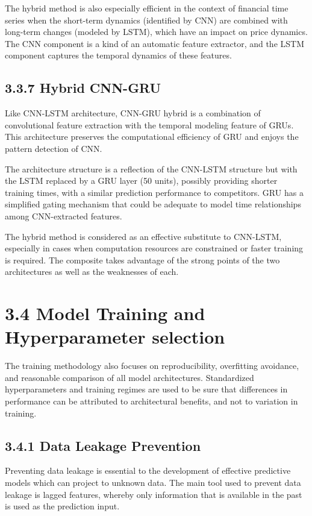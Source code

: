 \documentclass[12pt,a4paper]{report}
\begin{document}
The hybrid method is also especially efficient in the context of financial time series when the short-term dynamics (identified by CNN) are combined with long-term changes (modeled by LSTM), which have an impact on price dynamics. The CNN component is a kind of an automatic feature extractor, and the LSTM component captures the temporal dynamics of these features.

\subsection{3.3.7 Hybrid CNN-GRU}
Like CNN-LSTM architecture, CNN-GRU hybrid is a combination of convolutional feature extraction with the temporal modeling feature of GRUs. This architecture preserves the computational efficiency of GRU and enjoys the pattern detection of CNN.

The architecture structure is a reflection of the CNN-LSTM structure but with the LSTM replaced by a GRU layer (50 units), possibly providing shorter training times, with a similar prediction performance to competitors. GRU has a simplified gating mechanism that could be adequate to model time relationships among CNN-extracted features.

The hybrid method is considered as an effective substitute to CNN-LSTM, especially in cases when computation resources are constrained or faster training is required. The composite takes advantage of the strong points of the two architectures as well as the weaknesses of each.

\section{3.4 Model Training and Hyperparameter selection}
The training methodology also focuses on reproducibility, overfitting avoidance, and reasonable comparison of all model architectures. Standardized hyperparameters and training regimes are used to be sure that differences in performance can be attributed to architectural benefits, and not to variation in training.

\subsection{3.4.1 Data Leakage Prevention}
Preventing data leakage is essential to the development of effective predictive models which can project to unknown data. The main tool used to prevent data leakage is lagged features, whereby only information that is available in the past is used as the prediction input.
\end{document}
